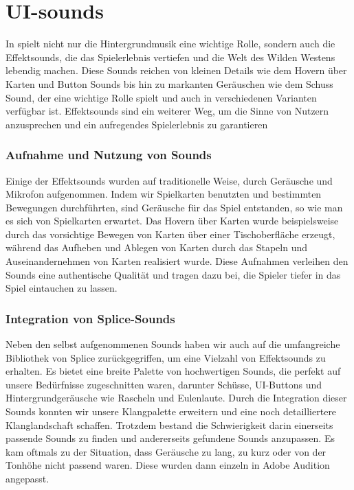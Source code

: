 
\section{UI-sounds}\label{sec:ui-sounds}

\renewcommand{\kapitelautor}{Autor: Nils Hubmann}

%
In \ff spielt nicht nur die Hintergrundmusik eine wichtige Rolle, sondern auch die Effektsounds, die das Spielerlebnis vertiefen und die Welt des Wilden Westens lebendig machen.
Diese Sounds reichen von kleinen Details wie dem Hovern über Karten und Button Sounds bis hin zu markanten Geräuschen wie dem Schuss Sound, der eine wichtige Rolle spielt und auch in verschiedenen Varianten verfügbar ist.
Effektsounds sind ein weiterer Weg, um die Sinne von Nutzern anzusprechen und ein aufregendes Spielerlebnis zu garantieren

\subsubsection{Aufnahme und Nutzung von Sounds}\label{subsubsec:Sound-Aufnahme}
Einige der Effektsounds wurden auf traditionelle Weise, durch Geräusche und Mikrofon aufgenommen.
Indem wir Spielkarten benutzten und bestimmten Bewegungen durchführten, sind Geräusche für das Spiel entstanden, so wie man es sich von Spielkarten erwartet.
Das Hovern über Karten wurde beispielsweise durch das vorsichtige Bewegen von Karten über einer Tischoberfläche erzeugt, während das Aufheben und Ablegen von Karten durch das Stapeln und Auseinandernehmen von Karten realisiert wurde.
Diese Aufnahmen verleihen den Sounds eine authentische Qualität und tragen dazu bei, die Spieler tiefer in das Spiel eintauchen zu lassen.

\subsubsection{Integration von Splice-Sounds}\label{subsubsec:Splice-Sounds}
Neben den selbst aufgenommenen Sounds haben wir auch auf die umfangreiche Bibliothek von Splice zurückgegriffen, um eine Vielzahl von Effektsounds zu erhalten.
Es bietet eine breite Palette von hochwertigen Sounds, die perfekt auf unsere Bedürfnisse zugeschnitten waren, darunter Schüsse, UI-Buttons und Hintergrundgeräusche wie Rascheln und Eulenlaute.
Durch die Integration dieser Sounds konnten wir unsere Klangpalette erweitern und eine noch detailliertere Klanglandschaft schaffen.
Trotzdem bestand die Schwierigkeit darin einerseits passende Sounds zu finden und andererseits gefundene Sounds anzupassen.
Es kam oftmals zu der Situation, dass Geräusche zu lang, zu kurz oder von der Tonhöhe nicht passend waren.
Diese wurden dann einzeln in Adobe Audition angepasst.

